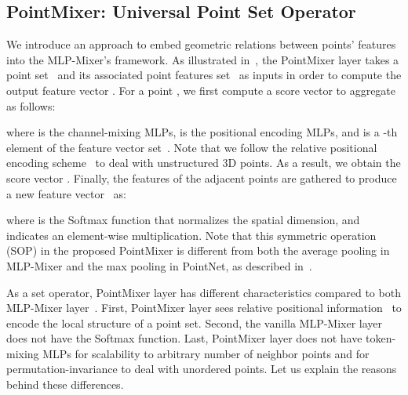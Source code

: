 \subsection{PointMixer: Universal Point Set Operator}
\label{subsec:Point Mixer Layer}
We introduce an approach to embed geometric relations between points' features into the MLP-Mixer's framework. 
As illustrated in~, the PointMixer layer takes a point set~ and its associated point features set~ as inputs in order to compute the output feature vector .
For a point , we first compute a score vector  to aggregate  as follows:

where  is the channel-mixing MLPs,  is the positional encoding MLPs, and  is a -th element of the feature vector set~.
Note that we follow the relative positional encoding scheme~\cite{pointnet++,point-transformer} to deal with unstructured 3D points.
As a result, we obtain the score vector . Finally, the features of the  adjacent points are gathered to produce a new feature vector~ as: 
\vspace{-2mm}
 
where  is the Softmax function that normalizes the spatial dimension, and  indicates an element-wise multiplication.
Note that this symmetric operation (SOP) in the proposed PointMixer is different from both the average pooling in MLP-Mixer and the max pooling in PointNet\plusplus, as described in~.



As a set operator, PointMixer layer has different characteristics compared to both MLP-Mixer layer~\cite{mlp-mixer}. First, PointMixer layer sees relative positional information~ to encode the local structure of a point set.
Second, the vanilla MLP-Mixer layer does not have the Softmax function.
Last, PointMixer layer does not have token-mixing MLPs for scalability to arbitrary number of neighbor points and for permutation-invariance to deal with unordered points. 
Let us explain the reasons behind these differences.



